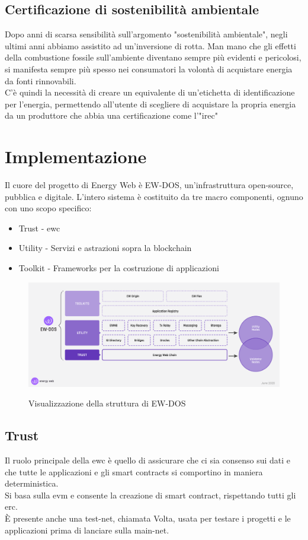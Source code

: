 \documentclass[12pt, letterpaper, twoside]{article}
\begin{document}
\subsection{Certificazione di sostenibilità ambientale}
Dopo anni di scarsa sensibilità sull'argomento "sostenibilità ambientale", negli ultimi anni abbiamo assistito ad un'inversione di rotta.
Man mano che gli effetti della combustione fossile sull'ambiente diventano sempre più evidenti e pericolosi, si manifesta sempre più spesso nei consumatori la volontà di acquistare energia da fonti rinnovabili.\\
C'è quindi la necessità di creare un equivalente di un'etichetta di identificazione per l'energia, permettendo all'utente di scegliere di acquistare la propria energia da un produttore che abbia una certificazione come l'"\gls{irec}"

\newpage

\section{Implementazione}
Il cuore del progetto di Energy Web è EW-DOS, un'infrastruttura open-source, pubblica e digitale.
L'intero sistema è costituito da tre macro componenti, ognuno con uno scopo specifico:
\begin{itemize}
    \item Trust - \gls{ewc}
    \item Utility - Servizi e astrazioni sopra la blockchain
    \item Toolkit - Frameworks per la costruzione di applicazioni
\end{itemize}

\begin{figure}[h]
    \includegraphics[width=13cm]{ew-dos}
    \centering
    \label{ew-dos}
    \caption{Visualizzazione della struttura di EW-DOS \cite{img:ew-dos}}
\end{figure}

\subsection{Trust}
Il ruolo principale della \gls{ewc} è quello di assicurare che ci sia consenso sui dati e che tutte le applicazioni e gli smart contracts si comportino in maniera deterministica.\\
Si basa sulla \gls{evm} e consente la creazione di smart contract, rispettando tutti gli \gls{erc}.\\
È presente anche una test-net, chiamata Volta, usata per testare i progetti e le applicazioni prima di lanciare sulla main-net.
\end{document}
